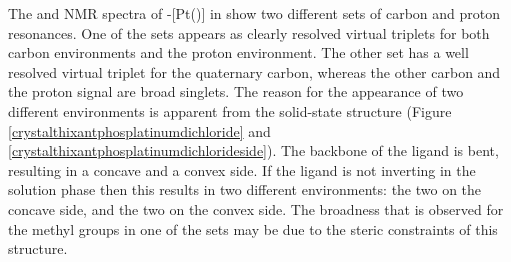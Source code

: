 %
%

The \proton{} and \carbon{} NMR spectra of \trans-[Pt(\tButhixantphos)] in  show two different sets of \tBu{} carbon and proton resonances.  One of the sets appears as clearly resolved virtual triplets for both carbon environments and the proton environment.  The other set has a well resolved virtual triplet for the quaternary carbon, whereas the other carbon and the proton signal are broad singlets.  The reason for the appearance of two different \tBu{} environments is apparent from the solid-state structure (Figure \ref{crystalthixantphosplatinumdichloride} and \ref{crystalthixantphosplatinumdichlorideside}).  The backbone of the \tButhixantphos{} ligand is bent, resulting in a concave and a convex side.  If the ligand is not inverting in the solution phase then this results in two different \tBu{} environments: the two on the concave side, and the two on the convex side.  The broadness that is observed for the methyl groups in one of the sets may be due to the steric constraints of this structure.  

